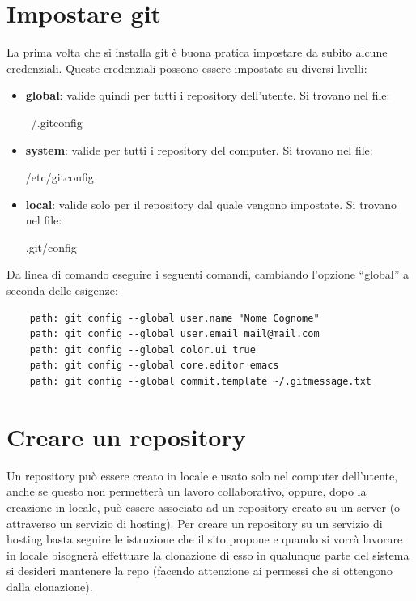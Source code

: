 \section{Impostare git} %
\label{sec:impostare_git}
La prima volta che si installa git è buona pratica impostare da subito alcune credenziali. \newline
Queste credenziali possono essere impostate su diversi livelli:
	\begin{itemize}
		\item \textbf{global}: valide quindi per tutti i repository dell'utente. Si trovano nel file:
			\begin{center}
				~/.gitconfig
			\end{center}
		\item \textbf{system}: valide per tutti i repository del computer. Si trovano nel file:
			\begin{center}
				/etc/gitconfig
			\end{center}
		\item \textbf{local}: valide solo per il repository dal quale vengono impostate. Si trovano nel file:
			\begin{center}
				.git/config
			\end{center}
	\end{itemize}
Da linea di comando eseguire i seguenti comandi, cambiando l'opzione ``global'' a seconda delle esigenze:
	\begin{verbatim}
	path: git config --global user.name "Nome Cognome"
	path: git config --global user.email mail@mail.com
	path: git config --global color.ui true
	path: git config --global core.editor emacs
	path: git config --global commit.template ~/.gitmessage.txt
	\end{verbatim}


\newpage \clearpage
\section{Creare un repository} %
\label{sec:creare_un_repository}
Un repository può essere creato in locale e usato solo nel computer dell'utente, anche se questo non permetterà un lavoro collaborativo, oppure, dopo la creazione in locale, può essere associato ad un repository creato su un server (o attraverso un servizio di hosting). \newline
Per creare un repository su un servizio di hosting basta seguire le istruzione che il sito propone e quando si vorrà lavorare in locale bisognerà effettuare la clonazione di esso in qualunque parte del sistema si desideri mantenere la repo (facendo attenzione ai permessi che si ottengono dalla clonazione).
